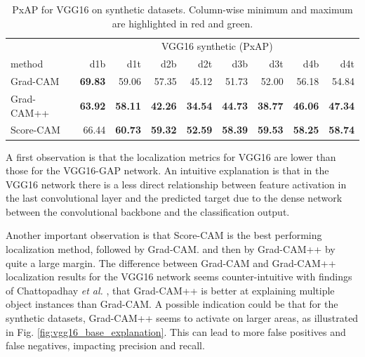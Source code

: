 \begin{table}[H]
\centering
\begin{tabular}{lrrrrrrrr}
\toprule
 & \multicolumn{8}{c}{VGG16 synthetic (PxAP)} \\
method & d1b & d1t & d2b & d2t & d3b & d3t & d4b & d4t \\
\cmidrule(lr){1-1} \cmidrule(lr){2-9}
Grad-CAM & \color{teal} \bfseries 69.83 & 59.06 & 57.35 & 45.12 & 51.73 & 52.00 & 56.18 & 54.84 \\
Grad-CAM++ & \color{purple} \bfseries 63.92 & \color{purple} \bfseries 58.11 & \color{purple} \bfseries 42.26 & \color{purple} \bfseries 34.54 & \color{purple} \bfseries 44.73 & \color{purple} \bfseries 38.77 & \color{purple} \bfseries 46.06 & \color{purple} \bfseries 47.34 \\
Score-CAM & 66.44 & \color{teal} \bfseries 60.73 & \color{teal} \bfseries 59.32 & \color{teal} \bfseries 52.59 & \color{teal} \bfseries 58.39 & \color{teal} \bfseries 59.53 & \color{teal} \bfseries 58.25 & \color{teal} \bfseries 58.74 \\
\bottomrule
\end{tabular}
\caption[PxAP for VGG16 on synthetic datasets]{PxAP for VGG16 on synthetic datasets. Column-wise minimum and maximum are highlighted in red and green.}
\label{tab:pxap_vgg16_base_synthetic}
\end{table}

A first observation is that the localization metrics for VGG16 are lower than those for the VGG16-GAP network. An intuitive explanation is that in the VGG16 network there is a less direct relationship between feature activation in the last convolutional layer and the predicted target due to the dense network between the convolutional backbone and the classification output. 

Another important observation is that Score-CAM is the best performing localization method, followed by Grad-CAM. and then by Grad-CAM++ by quite a large margin. The difference between Grad-CAM and Grad-CAM++ localization results for the VGG16 network seems counter-intuitive with findings of Chattopadhay \textit{et al.} \cite{chattopadhay2018grad}, that Grad-CAM++ is better at explaining multiple object instances than Grad-CAM. A possible indication could be that for the synthetic datasets, Grad-CAM++ seems to activate on larger areas, as illustrated in Fig. \ref{fig:vgg16_base_explanation}. This can lead to more false positives and false negatives, impacting precision and recall.

